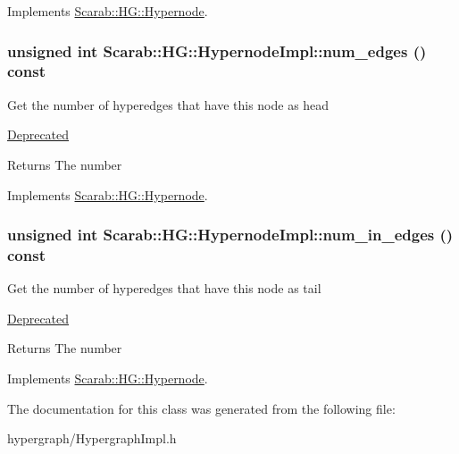 Implements \hyperlink{class_scarab_1_1_h_g_1_1_hypernode_ae3e1107309a8817d1015bd70a90c1c49}{Scarab::HG::Hypernode}.

\hypertarget{class_scarab_1_1_h_g_1_1_hypernode_impl_a7fed4809706319cc916ed4c04a641436}{
\subsubsection[{num\_\-edges}]{\setlength{\rightskip}{0pt plus 5cm}unsigned int Scarab::HG::HypernodeImpl::num\_\-edges () const}}
\label{class_scarab_1_1_h_g_1_1_hypernode_impl_a7fed4809706319cc916ed4c04a641436}
Get the number of hyperedges that have this node as head \begin{Desc}
\item[\hyperlink{deprecated__deprecated000007}{Deprecated}]\end{Desc}
\begin{DoxyReturn}{Returns}
The number 
\end{DoxyReturn}


Implements \hyperlink{class_scarab_1_1_h_g_1_1_hypernode_add2f4d556be223b906bfbab9f1b60870}{Scarab::HG::Hypernode}.

\hypertarget{class_scarab_1_1_h_g_1_1_hypernode_impl_a9a13a37fcece16603ec4bf3f364e6fcc}{
\subsubsection[{num\_\-in\_\-edges}]{\setlength{\rightskip}{0pt plus 5cm}unsigned int Scarab::HG::HypernodeImpl::num\_\-in\_\-edges () const}}
\label{class_scarab_1_1_h_g_1_1_hypernode_impl_a9a13a37fcece16603ec4bf3f364e6fcc}
Get the number of hyperedges that have this node as tail \begin{Desc}
\item[\hyperlink{deprecated__deprecated000008}{Deprecated}]\end{Desc}
\begin{DoxyReturn}{Returns}
The number 
\end{DoxyReturn}


Implements \hyperlink{class_scarab_1_1_h_g_1_1_hypernode_a4b1a4ffaa8a8b0295763673e6d86d693}{Scarab::HG::Hypernode}.



The documentation for this class was generated from the following file:\begin{DoxyCompactItemize}
\item 
hypergraph/HypergraphImpl.h\end{DoxyCompactItemize}

